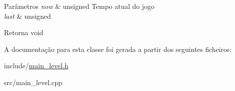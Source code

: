 \begin{DoxyParams}{Parâmetros}
{\em now} & unsigned Tempo atual do jogo \\
\hline
{\em last} & unsigned \\
\hline
\end{DoxyParams}
\begin{DoxyReturn}{Retorna}
void 
\end{DoxyReturn}


A documentação para esta classe foi gerada a partir dos seguintes ficheiros\+:\begin{DoxyCompactItemize}
\item 
include/\mbox{\hyperlink{main__level_8h}{main\+\_\+level.\+h}}\item 
src/main\+\_\+level.\+cpp\end{DoxyCompactItemize}
